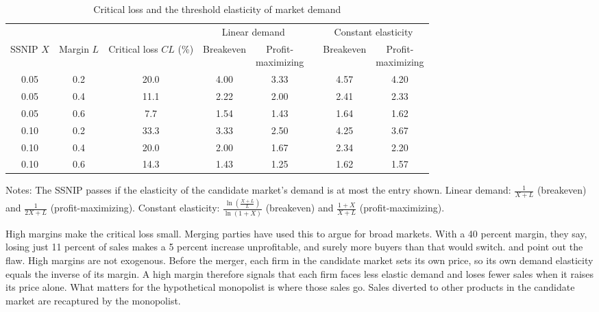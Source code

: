 \begin{table}[htbp]
\centering
\caption{Critical loss and the threshold elasticity of market demand}
\label{tab:11-critloss}
\footnotesize
\begin{tabular}{@{}cccccccc@{}}
\toprule
 & & & \multicolumn{2}{c}{Linear demand} & & \multicolumn{2}{c}{Constant elasticity} \\
\cmidrule{4-5} \cmidrule{7-8}
\makecell{SSNIP\\$X$} & \makecell{Margin\\$L$} & \makecell{Critical loss\\$\mathit{CL}$ (\%)} & Breakeven &
\makecell{Profit-\\maximizing} & & Breakeven & \makecell{Profit-\\maximizing} \\
\midrule
0.05 & 0.2 & 20.0 & 4.00 & 3.33 & & 4.57 & 4.20 \\
0.05 & 0.4 & 11.1 & 2.22 & 2.00 & & 2.41 & 2.33 \\
0.05 & 0.6 & \phantom{0}7.7 & 1.54 & 1.43 & & 1.64 & 1.62 \\
0.10 & 0.2 & 33.3 & 3.33 & 2.50 & & 4.25 & 3.67 \\
0.10 & 0.4 & 20.0 & 2.00 & 1.67 & & 2.34 & 2.20 \\
0.10 & 0.6 & 14.3 & 1.43 & 1.25 & & 1.62 & 1.57 \\
\bottomrule
\end{tabular}

\vspace{3pt}
\begin{minipage}{0.97\textwidth}
\footnotesize Notes: The SSNIP passes if the elasticity of the candidate market's demand is at most the entry
shown. Linear demand: $\frac{1}{X + L}$ (breakeven) and $\frac{1}{2X + L}$ (profit-maximizing). Constant
elasticity: $\frac{\ln\left(\frac{X + L}{L}\right)}{\ln(1 + X)}$ (breakeven) and $\frac{1 + X}{X + L}$
(profit-maximizing).
\end{minipage}
\end{table}

High margins make the critical loss small. Merging parties have used this to argue for broad markets. With a
40 percent margin, they say, losing just 11 percent of sales makes a 5 percent increase unprofitable, and surely
more buyers than that would switch. \citet{KatzShapiro2003} and \citet{OBrienWickelgren2003} point out the flaw. High
margins are not exogenous. Before the merger, each firm in the candidate market sets its own price, so its own
demand elasticity equals the inverse of its margin. A high margin therefore signals that each firm faces less elastic
demand and loses fewer sales when it raises its price alone. What matters for the hypothetical monopolist is where
those sales go. Sales diverted to other products in the candidate market are recaptured by the monopolist.

